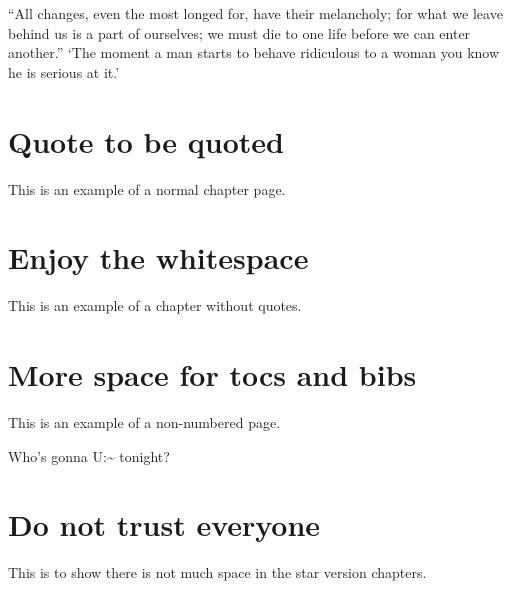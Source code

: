 \documentclass[a4paper]{report}
\begin{document}
\begin{savequote}[8cm]
  ``All changes, even the most longed for, have their melancholy;
  for what we leave behind us is a part of ourselves; we must
  die to one life before we can enter another.''
  `The moment a man starts to behave ridiculous to a woman
  you know he is serious at it.'
\end{savequote}
\makeatletter
\chapter{Quote to be quoted}
This is an example of a normal chapter page.

\chapter{Enjoy the whitespace}
This is an example of a chapter without quotes.

\chapter*{More space for tocs and bibs}
This is an example of a non-numbered page.

\begin{savequote}[5cm]
  Who's gonna {\upshape\ttfamily U:\textasciitilde} tonight?
\end{savequote}
\chapter*{Do not trust everyone}
This is to show there is not much space in the star version chapters.
\end{document}
